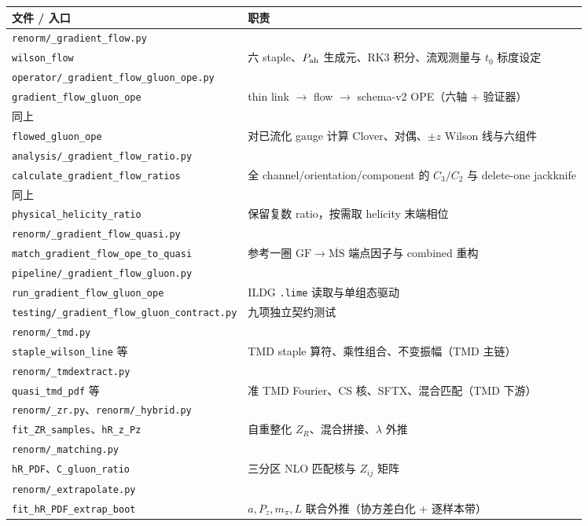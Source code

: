 \documentclass[11pt,a4paper]{ctexart}
\newcommand{\MSbarM}{\overline{\text{MS}}}
\newcommand{\code}[1]{\texttt{#1}}
\newcommand{\GFr}{\mathrm{GF}}
\begin{document}
\medskip
\begin{center}
\scriptsize
\begin{tabularx}{\textwidth}{@{}p{} >{\raggedright\arraybackslash}X@{}}
\toprule
\textbf{文件 / 入口} & \textbf{职责} \\
\midrule
\code{renorm/\_gradient\_flow.py}\\\code{wilson\_flow} &
六 staple、$P_{\rm ah}$ 生成元、RK3 积分、流观测量与 $t_0$ 标度设定 \\
\midrule
\code{operator/\_gradient\_flow\_gluon\_ope.py}\\\code{gradient\_flow\_gluon\_ope} &
thin link $\to$ flow $\to$ schema-v2 OPE（六轴 + 验证器） \\
\midrule
同上\\\code{flowed\_gluon\_ope} &
对已流化 gauge 计算 Clover、对偶、$\pm z$ Wilson 线与六组件 \\
\midrule
\code{analysis/\_gradient\_flow\_ratio.py}\\\code{calculate\_gradient\_flow\_ratios} &
全 channel/orientation/component 的 $C_3/C_2$ 与 delete-one jackknife \\
\midrule
同上\\\code{physical\_helicity\_ratio} &
保留复数 ratio，按需取 helicity 末端相位 \\
\midrule
\code{renorm/\_gradient\_flow\_quasi.py}\\\code{match\_gradient\_flow\_ope\_to\_quasi} &
参考一圈 $\GFr\to\MSbarM$ 端点因子与 combined 重构 \\
\midrule
\code{pipeline/\_gradient\_flow\_gluon.py}\\\code{run\_gradient\_flow\_gluon\_ope} &
ILDG \code{.lime} 读取与单组态驱动 \\
\midrule
\code{testing/\_gradient\_flow\_gluon\_contract.py} &
九项独立契约测试 \\
\midrule
\code{renorm/\_tmd.py}\\\code{staple\_wilson\_line} 等 &
TMD staple 算符、乘性组合、不变振幅（TMD 主链） \\
\midrule
\code{renorm/\_tmdextract.py}\\\code{quasi\_tmd\_pdf} 等 &
准 TMD Fourier、CS 核、SFTX、混合匹配（TMD 下游） \\
\midrule
\code{renorm/\_zr.py}、\code{renorm/\_hybrid.py}\\\code{fit\_ZR\_samples}、\code{hR\_z\_Pz} &
自重整化 $Z_R$、混合拼接、$\lambda$ 外推 \\
\midrule
\code{renorm/\_matching.py}\\\code{hR\_PDF}、\code{C\_gluon\_ratio} &
三分区 NLO 匹配核与 $Z_{ij}$ 矩阵 \\
\midrule
\code{renorm/\_extrapolate.py}\\\code{fit\_hR\_PDF\_extrap\_boot} &
$a,P_z,m_\pi,L$ 联合外推（协方差白化 + 逐样本带） \\
\bottomrule
\end{tabularx}
\end{center}
\end{document}
